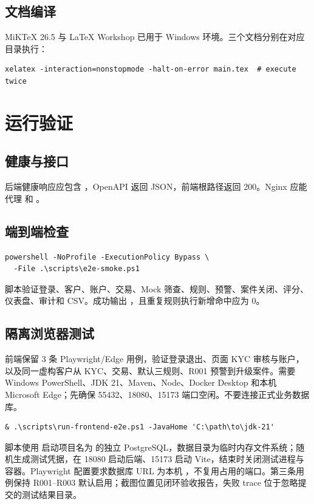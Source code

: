 \documentclass[UTF8,openany,zihao=-4]{ctexrep}
\begin{document}
\section{文档编译}
MiKTeX 26.5 与 LaTeX Workshop 已用于 Windows 环境。三个文档分别在对应目录执行：
\begin{lstlisting}
xelatex -interaction=nonstopmode -halt-on-error main.tex  # execute twice
\end{lstlisting}

\chapter{运行验证}
\section{健康与接口}
后端健康响应应包含 ，OpenAPI 返回 JSON，前端根路径返回 200。Nginx 应能代理  和 。

\section{端到端检查}
\begin{lstlisting}
powershell -NoProfile -ExecutionPolicy Bypass \
  -File .\scripts\e2e-smoke.ps1
\end{lstlisting}
脚本验证登录、客户、账户、交易、Mock 筛查、规则、预警、案件关闭、评分、仪表盘、审计和 CSV。成功输出 ，且重复规则执行新增命中应为 0。

\section{隔离浏览器测试}
前端保留 3 条 Playwright/Edge 用例，验证登录退出、页面 KYC 审核与账户，以及同一虚构客户从 KYC、交易、默认三规则、R001 预警到升级案件。需要 Windows PowerShell、JDK 21、Maven、Node、Docker Desktop 和本机 Microsoft Edge；先确保 55432、18080、15173 端口空闲。不要连接正式业务数据库。
\begin{lstlisting}
& .\scripts\run-frontend-e2e.ps1 -JavaHome 'C:\path\to\jdk-21'
\end{lstlisting}
脚本使用  启动项目名为  的独立 PostgreSQL，数据目录为临时内存文件系统；随机生成测试凭据，在 18080 启动后端、15173 启动 Vite，结束时关闭测试进程与容器。Playwright 配置要求数据库 URL 为本机 ，不复用占用的端口。第三条用例保持 R001--R003 默认启用；截图位置见闭环验收报告，失败 trace 位于忽略提交的测试结果目录。
\end{document}
